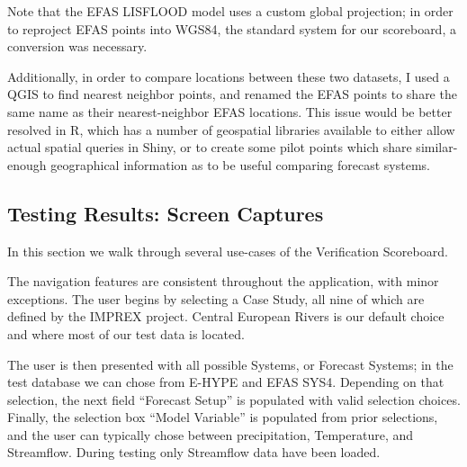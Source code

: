 \documentclass[logos,parttoc,morelanguage=french,morelanguage=german,draft]{orsay-memoire}
\begin{document}
Note that the EFAS LISFLOOD model uses a custom global projection; in order to reproject EFAS points into WGS84, the standard system for our scoreboard, a conversion was necessary.

Additionally, in order to compare locations between these two datasets, I used a QGIS to find nearest neighbor points, and renamed the EFAS points to share the same name as their nearest-neighbor EFAS locations. This issue would be better resolved in R, which has a number of geospatial libraries available to either allow actual spatial queries in Shiny, or to create some pilot points which share similar-enough geographical information as to be useful comparing forecast systems.


%
%

\subsection{Testing Results: Screen Captures}

In this section we walk through several use-cases of the Verification Scoreboard.

The navigation features are consistent throughout the application, with minor exceptions. The user begins by selecting a Case Study, all nine of which are defined by the IMPREX project. Central European Rivers is our default choice and where most of our test data is located.

The user is then presented with all possible Systems, or Forecast Systems; in the test database we can chose from E-HYPE and EFAS SYS4. Depending on that selection, the next field ``Forecast Setup'' is populated with valid selection choices. Finally, the selection box ``Model Variable'' is populated from prior selections, and the user can typically chose between precipitation, Temperature, and Streamflow. During testing only Streamflow data have been loaded.
\end{document}
